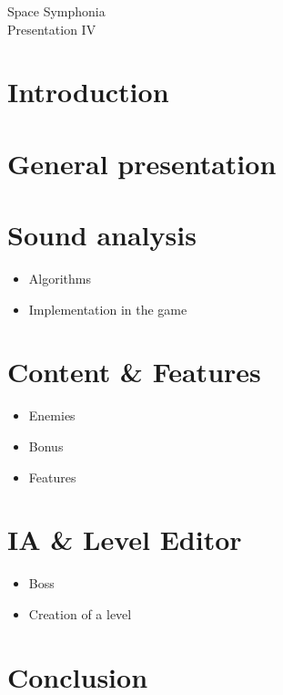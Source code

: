 \documentclass[12pt,a4paper]{article}
\title{}
\author{}
\date{}
\begin{document}
	\begin{center}
		\Huge{Space Symphonia} \\
		\Large{Presentation IV}
	\end{center}
	\vspace{2cm}
	\section{Introduction}
	\section{General presentation}
	\section{Sound analysis}
		\begin{itemize}
			\item Algorithms
			\item Implementation in the game
		\end{itemize}
	\section{Content \& Features}
		\begin{itemize}
			\item Enemies
			\item Bonus
			\item Features
		\end{itemize}
	\section{IA \& Level Editor}
		\begin{itemize}
			\item Boss
			\item Creation of a level
		\end{itemize}
	\section{Conclusion}
\end{document}
